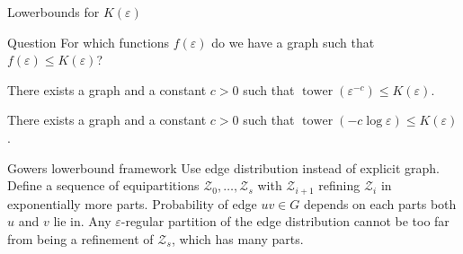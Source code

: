 \documentclass{beamer}
\DeclareMathOperator{\twr}{\mathrm{tower}}
\newcommand{\1}{\mathbbm{1}}
\newcommand{\Z}{\mathcal{Z}}
\newcommand{\eps}{\varepsilon}
\begin{document}
\begin{frame}{Lowerbounds for $K(\eps)$}
  \begin{block}{Question}
    For which functions $f(\eps)$ do we have a graph such that $f(\eps) \le K(\eps)$?
  \end{block}

  \pause
  \begin{theorem}[Gowers (1997)]
    There exists a graph and a constant $c > 0$ such that $\twr(\eps^{-c}) \le K(\eps)$.
  \end{theorem}

  \pause

  \begin{corollary}[Gowers (1997)]
    There exists a graph and a constant $c > 0$ such that $\twr(-c\log \eps) \le
      K(\eps)$.
  \end{corollary}
\end{frame}







\begin{frame}{Gowers lowerbound framework}
  Use edge distribution instead of explicit graph.
  \pause
  Define a sequence of equipartitions $\Z_0, \dots, \Z_s$ with $\Z_{i + 1}$ refining
  $\Z_i$ in exponentially more parts.
  \pause
  Probability of edge $uv \in G$ depends on each parts both $u$ and $v$ lie in.
  \pause
  Any $\eps$-regular partition of the edge distribution cannot be too far from being a
  refinement of $\Z_s$, which has many parts.
\end{frame}
\end{document}
